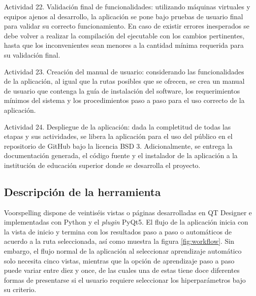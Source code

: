 \begin{APAitemize}
    \item Actividad 22. Validación final de funcionalidades: utilizando máquinas virtuales y equipos ajenos al desarrollo, la aplicación se pone bajo pruebas de usuario final para validar su correcto funcionamiento. En caso de existir errores inesperados se debe volver a realizar la compilación del ejecutable con los cambios pertinentes, hasta que los inconvenientes sean menores a la cantidad mínima requerida para su validación final.
    \item Actividad 23. Creación del manual de usuario: considerando las funcionalidades de la aplicación, al igual que la rutas posibles que se ofrecen, se crea un manual de usuario que contenga la guía de instalación del software, los requerimientos mínimos del sistema y los procedimientos paso a paso para el uso correcto de la aplicación.
    \item Actividad 24. Despliegue de la aplicación: dada la completitud de todas las etapas y sus actividades, se libera la aplicación para el uso del público en el repositorio de GitHub bajo la licencia BSD 3. Adicionalmente, se entrega la documentación generada, el código fuente y el instalador de la aplicación a la institución de educación superior donde se desarrolla el proyecto.
\end{APAitemize}

\subsection{Descripción de la herramienta}

Voorspelling dispone de veintiséis vistas o páginas desarrolladas en QT Designer e implementadas con Python y el \textit{plugin} PyQt5. El flujo de la aplicación inicia con la vista de inicio y termina con los resultados paso a paso o automáticos de acuerdo a la ruta seleccionada, así como muestra la figura \ref{fig:workflow}. Sin embargo, el flujo normal de la aplicación al seleccionar aprendizaje automático solo necesita cinco vistas, mientras que la opción de aprendizaje paso a paso puede variar entre diez y once, de las cuales una de estas tiene doce diferentes formas de presentarse si el usuario requiere seleccionar los hiperparámetros bajo su criterio.

